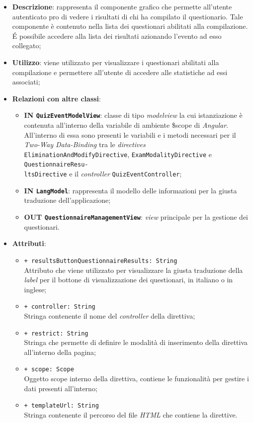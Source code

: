 \begin{itemize}
	\item \textbf{Descrizione}: rappresenta il componente grafico che permette all'utente autenticato pro di vedere i risultati di chi ha compilato il questionario. Tale componente è contenuto nella lista dei questionari abilitati alla compilazione. \'E possibile accedere alla lista dei risultati azionando l'evento ad esso collegato;
	\item \textbf{Utilizzo}: viene utilizzato per visualizzare i questionari abilitati alla compilazione e permettere all'utente di accedere alle statistiche ad essi associati;
	\item \textbf{Relazioni con altre classi}: 
	\begin{itemize} 
		\item \textbf{IN \texttt{QuizEventModelView}}: classe di tipo \textit{modelview} la cui istanziazione è contenuta all'interno della variabile di ambiente \$scope di \textit{Angular}. All'interno di essa sono presenti le variabili e i metodi necessari per il \textit{Two-Way Data-Binding} tra le \textit{directives} \texttt{EliminationAndModifyDirective}, \texttt{ExamModalityDirective} e \texttt{QuestionnaireResu-\\ltsDirective} e il \textit{controller} \texttt{QuizEventController};
		\item \textbf{IN \texttt{LangModel}}: rappresenta il modello delle informazioni per la giusta traduzione dell'applicazione;
		\item \textbf{OUT \texttt{QuestionnaireManagementView}}: \textit{view} principale per la gestione dei questionari.
	\end{itemize}
	\item \textbf{Attributi}: 
	\begin{itemize}
		\item \texttt{+ resultsButtonQuestionnaireResults: String} \\ Attributo che viene utilizzato per visualizzare la giusta traduzione della \textit{label} per il bottone di visualizzazione dei questionari, in italiano o in inglese;
		\item \texttt{+ controller: String} \\ Stringa contenente il nome del \textit{controller} della direttiva;
		\item \texttt{+ restrict: String} \\ Stringa che permette di definire le modalità di inserimento della direttiva all'interno della pagina;
		\item \texttt{+ scope: Scope} \\ Oggetto scope interno della direttiva, contiene le funzionalità per gestire i dati presenti all'interno;
		\item \texttt{+ templateUrl: String} \\ Stringa contenente il percorso del file \textit{HTML} che contiene la direttive.
	\end{itemize} 
\end{itemize}
